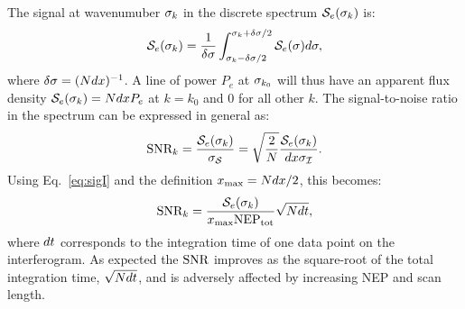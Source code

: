 The signal at wavenumuber $\sigma_k$ in the discrete spectrum $\mathcal{S}_e(\sigma_k)$ is:
\begin{equation}
 \mathcal{S}_e(\sigma_k) = \frac{1}{\delta\sigma}\int^{\sigma_k+\delta\sigma/2}_{\sigma_k-\delta\sigma/2} \mathcal{S}_e(\sigma)d\sigma,
\label{eq:signal}
 \end{equation}
where $\delta\sigma = (Ndx)^{-1}$. A line of power $P_e$ at $\sigma_{k_0}$  will thus have an apparent flux density $\mathcal{S}_e(\sigma_k) = Nd xP_e$ at $k=k_0$ and $0$ for all other $k$. The signal-to-noise ratio in the spectrum can be expressed in general as:
\begin{equation} 
\textrm{SNR}_k  = \frac{\mathcal{S}_e(\sigma_k)}{\sigma_\mathcal{S}} =\sqrt{\frac{2}{N}}\frac{\mathcal{S}_e(\sigma_k)}{dx\sigma_{\mathcal{I}}} .
\label{eq:spectralSNR}
\end{equation}
Using Eq.~\ref{eq:sigI} and the definition $x_{\textrm{max}}=Ndx/2$, this becomes:
\begin{equation}
\textrm{SNR}_k = \frac{\mathcal{S}_e(\sigma_k)}{x_{\textrm{max}}\textrm{NEP}_\textrm{tot}} \sqrt{N dt},
\end{equation}
where $dt$ corresponds to the integration time of one data point on the interferogram. As expected the $\textrm{SNR}$ improves as the square-root of the total integration time, $\sqrt{N dt}$, and is adversely affected by increasing NEP and scan length. 


